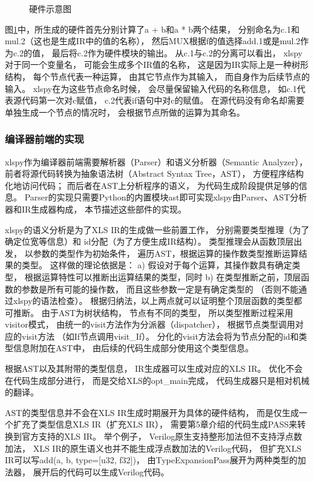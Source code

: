 \begin{figure}[h]
\centering

\caption{硬件示意图}
\label{fig.1}
\end{figure}

图\ref{fig.1}中，所生成的硬件首先分别计算了a + b和a * b两个结果，
分别命名为c.1和mul.2（这也是生成IR中的值的名称），
然后MUX根据f的值选择add.1或是mul.2作为c.2的值，
最后将c.2作为硬件模块的输出。
从c.1与c.2的分离可以看出，
xlspy对于同一个变量名，
可能会生成多个IR值的名称，
这是因为IR实际上是一种树形结构，
每个节点代表一种运算，
由其它节点作为其输入，
而自身作为后续节点的输入。
xlspy在为这些节点命名时候，
会尽量保留输入代码的名称信息，
如c.1代表源代码第一次对c赋值，
c.2代表if语句中对c的赋值。
在源代码没有命名却需要单独生成一个节点的情况时，
会根据节点所做的运算为其命名。

\subsubsection{编译器前端的实现}

xlspy作为编译器前端需要解析器（Parser）和语义分析器（Semantic Analyzer），
前者将源代码转换为抽象语法树（Abstract Syntax Tree，AST），
方便程序结构化地访问代码；
而后者在AST上分析程序的语义，
为代码生成阶段提供足够的信息。
Parser的实现只需要Python的内置模块ast即可实现xlspy由Parser、AST分析器和IR生成器构成，
本节描述这些部件的实现。

xlspy的语义分析是为了XLS IR的生成做一些前置工作，
分别需要类型推理（为了确定位宽等信息）和
id分配（为了方便生成IR结构）。
类型推理会从函数顶层出发，
以参数的类型作为初始条件，
遍历AST，根据运算的操作数类型推断运算结果的类型。
这样做的理论依据是：
a) 假设对于每个运算，其操作数具有确定类型，
根据运算特性可以推断出运算结果的类型，同时
b) 在类型推断之前，顶层函数的参数是所有可能的操作数，
而且这些参数一定是有确定类型的
（否则不能通过xlspy的语法检查）。
根据归纳法，以上两点就可以证明整个顶层函数的类型都可推断。
由于AST为树状结构，
节点有不同的类型，
所以类型推断过程采用visitor模式，
由统一的visit方法作为分派器（dispatcher），
根据节点类型调用对应的visit方法
（如If节点调用visit\_If）。
分化的visit方法会将为节点分配的id和类型信息附加在AST中，
由后续的代码生成部分使用这个类型信息。

根据AST以及其附带的类型信息，
IR生成器可以生成对应的XLS IR。
优化不会在代码生成部分进行，
而是交给XLS的opt\_main完成，
代码生成器只是相对机械的翻译。

AST的类型信息并不会在XLS IR生成时期展开为具体的硬件结构，
而是仅生成一个扩充了类型信息XLS IR（扩充XLS IR），
需要第5章介绍的代码生成PASS来转换到官方支持的XLS IR。
举个例子，
Verilog原生支持整形加法但不支持浮点数加法，
XLS IR的原生语义也并不能生成浮点数加法的Verilog代码，
但扩充XLS IR可以写add(a, b, type=[u32, f32])，
由TypeExpansionPass展开为两种类型的加法器，
展开后的代码可以生成Verilog代码。

